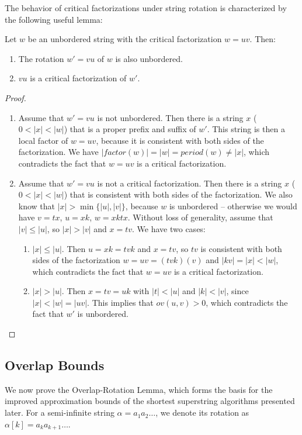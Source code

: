 The behavior of critical factorizations under string rotation is characterized
by the following useful lemma:

\begin{lemma} \label{lemma:unbordered_rotation}
Let $w$ be an unbordered string with the critical factorization $w = uv$. Then:
\begin{enumerate}
    \item The rotation $w' = vu$ of $w$ is also unbordered.
    \item $vu$ is a critical factorization of $w'$.
\end{enumerate}
\end{lemma}

\begin{proof}
\noindent
\begin{enumerate}[label=(\arabic*), leftmargin=*]
\item Assume that $w' = vu$ is not unbordered. Then there is a string $x$ ($0 <
|x| < |w|$) that is a proper prefix and suffix of $w'$. This string is then a
local factor of $w = uv$, because it is consistent with both sides of the
factorization. We have $|\textit{factor}(w)| = |w| = \textit{period}(w) \neq
|x|$, which contradicts the fact that $w = uv$ is a critical factorization.

\item Assume that $w' = vu$ is not a critical factorization. Then there is a
string $x$ ($0 < |x| < |w|$) that is consistent with both sides of the
factorization. We also know that $|x| > \min\{|u|,|v|\}$, because $w$ is
unbordered -- otherwise we would have $v = tx$, $u = xk$, $w = xktx$. Without
loss of generality, assume that $|v| \leq |u|$, so $|x| > |v|$ and $x = tv$. We
have two cases:
\begin{enumerate}[label=(\arabic{enumi}.\arabic*), leftmargin=*]
\item $|x| \leq |u|$. Then $u = xk = tvk$ and $x = tv$, so $tv$ is consistent
with both sides of the factorization $w = uv = (tvk)(v)$ and $|kv| = |x| < |w|$,
which contradicts the fact that $w = uv$ is a critical factorization.
\item $|x| > |u|$. Then $x = tv = uk$ with $|t| < |u|$ and $|k| < |v|$, since
$|x| < |w| = |uv|$. This implies that $\textit{ov}(u,v) > 0$, which contradicts
the fact that $w'$ is unbordered.
\end{enumerate}
\end{enumerate}
\end{proof}

\subsection{Overlap Bounds}
We now prove the Overlap-Rotation Lemma, which forms the basis for the improved
approximation bounds of the shortest superstring algorithms presented later. For
a semi-infinite string $\alpha = a_1 a_2 \dots$, we denote its rotation as
$\alpha[k] = a_k a_{k+1} \dots$.

